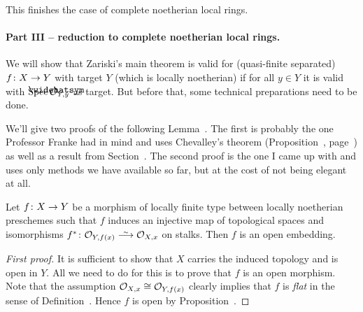 \documentclass[a4paper,parskip=half,numbers=enddot, DIV=12]{scrreprt}
\begin{document}
This finishes the case of complete noetherian local rings.

\paragraph{Part III -- reduction to complete noetherian local rings.} We will show that Zariski's main theorem is valid for (quasi-finite separated) $f\colon X\morphism Y$ with target $Y$ (which is locally noetherian) if for all $y\in Y$ it is valid with $\Spec \roof{\Oo}_{Y,y}$ as target. But before that, some technical preparations need to be done.

We'll give two proofs of the following Lemma~. The first is probably the one Professor Franke had in mind and uses Chevalley's theorem (Proposition~, page~\pageref{prop:GenericFreeness}) as well as a result from Section~. The second proof is the one I came up with and uses only methods we have available so far, but at the cost of not being elegant at all.
\begin{lem}
	Let $f\colon X\morphism Y$ be a morphism of locally finite type between locally noetherian preschemes such that $f$ induces an injective map of topological spaces and isomorphisms $f^*\colon \Oo_{Y,f(x)}\isomorphism \Oo_{X,x}$ on stalks. Then $f$ is an open embedding.
\end{lem}
\begin{proof}[First proof]
	It is sufficient to show that $X$ carries the induced topology and is open in $Y$. All we need to do for this is to prove that $f$ is an open morphism. Note that the assumption $\mathcal{O}_{X,x}\cong \mathcal{O}_{Y,f(x)}$ clearly implies that $f$ is \emph{flat} in the sense of Definition~. Hence $f$ is open by Proposition~.
\end{proof}
\end{document}
